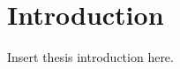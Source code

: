 \chapter{Introduction}

{\color{red}%
Insert thesis introduction here.
}

\lipsum[1-8]
\cite{making_decryption_accountable}
\cite{inert_and_public_recovery}
